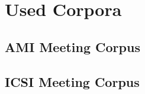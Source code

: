 \chapter{Used Corpora}\label{ch:used-corpora}

\Blindtext


\section{AMI Meeting Corpus}

\Blindtext


\section{ICSI Meeting Corpus}

\Blindtext